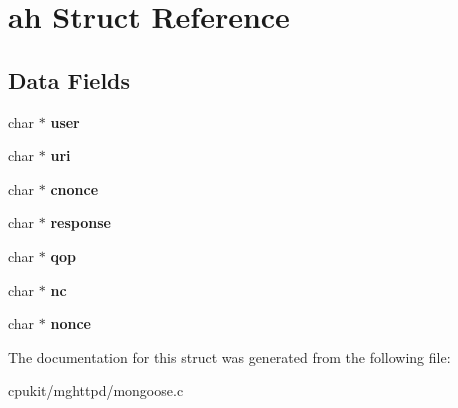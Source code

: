 \hypertarget{structah}{}\section{ah Struct Reference}
\label{structah}
\subsection*{Data Fields}
\begin{DoxyCompactItemize}
\item 
\mbox{\label{structah_a6a47edd6e080153254efde58725a372f}} 
char $\ast$ {\bfseries user}
\item 
\mbox{\label{structah_a603650deca0d0a4c13695ea61bf80d8e}} 
char $\ast$ {\bfseries uri}
\item 
\mbox{\label{structah_a4440fb3ea2df6ae670ceaffb35343fea}} 
char $\ast$ {\bfseries cnonce}
\item 
\mbox{\label{structah_ad7ad138100657d792ece1eb9f2a5046c}} 
char $\ast$ {\bfseries response}
\item 
\mbox{\label{structah_ad75d946f91b89809f25620a78124c017}} 
char $\ast$ {\bfseries qop}
\item 
\mbox{\label{structah_a215c0ed8072571b8c43a66ddbc2fc478}} 
char $\ast$ {\bfseries nc}
\item 
\mbox{\label{structah_a231eacaa1fb35d4b80dca8b15bc5be67}} 
char $\ast$ {\bfseries nonce}
\end{DoxyCompactItemize}


The documentation for this struct was generated from the following file\+:\begin{DoxyCompactItemize}
\item 
cpukit/mghttpd/mongoose.\+c\end{DoxyCompactItemize}
